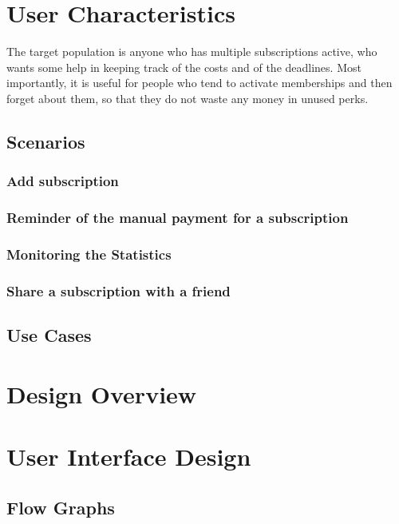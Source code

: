 \documentclass[11pt]{article}
\begin{document}
\newpage
\section{User Characteristics}\label{sec:char}
The target population is anyone who has multiple subscriptions active, who wants some help in keeping track of the costs and of the deadlines. Most importantly, it is useful for people who tend to activate memberships and then forget about them, so that they do not waste any money in unused perks.

\subsection{Scenarios}\label{sub:scenarios}
\subsubsection{Add subscription}

\subsubsection{Reminder of the manual payment for a subscription}

\subsubsection{Monitoring the Statistics}

\subsubsection{Share a subscription with a friend}

\subsection{Use Cases}\label{sub:usecases}

\newpage
\section{Design Overview}\label{sec:design}

\newpage
\section{User Interface Design}\label{sec:ui}
\subsection{Flow Graphs}
\end{document}
